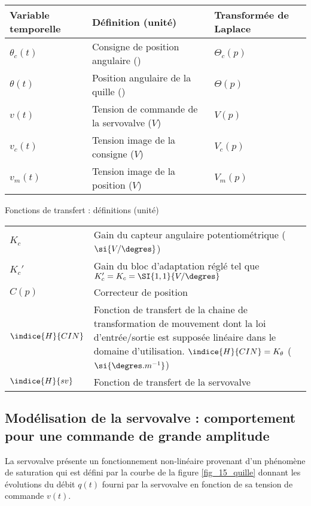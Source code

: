 \begin{center}
\begin{tabular}{lll}
\hline
Variable temporelle	& Définition (unité)				& Transformée de Laplace \\
\hline
$\theta_c(t)$		& Consigne de position angulaire (\degres)	& $\Theta_c(p)$ \\
$\theta(t)$		& Position angulaire de la quille (\degres)	& $\Theta(p)$ \\
$v(t)$			& Tension de commande de la servovalve ($V$)	& $V(p)$ 	\\
$v_c(t)$		& Tension image de la consigne ($V$)		& $V_c(p)$ 	\\
$v_m(t)$ 	 	& Tension image de la position ($V$)		& $V_m(p)$ 	\\
\hline
\end{tabular}
\end{center}



\begin{center}
Fonctions de transfert : définitions (unité)
\begin{tabular}{lp{14cm}}
\hline
$K_c$			& Gain du capteur angulaire potentiométrique ($\si{V/\degres}$) \\
$K_c'$			& Gain du bloc d’adaptation réglé tel que $K_c' = K_c = \SI{1,1}{V/\degres}$ \\
$C(p)$			& Correcteur de position 	\\
$\indice{H}{CIN}$ 	& Fonction de transfert de la chaine de transformation de mouvement 
			dont la loi d’entrée/sortie est supposée linéaire dans le domaine d’utilisation.                
			 $\indice{H}{CIN} = K_{\theta}$ ($\si{\degres.m^{-1}}$) \\
$\indice{H}{sv}$	& Fonction de transfert de la servovalve  \\
\hline
\end{tabular}
\end{center}
\fi




\subsection{Modélisation de la servovalve : comportement pour une commande de grande amplitude}

\ifprof
\else
La servovalve présente un fonctionnement non-linéaire provenant d’un phénomène de saturation qui est défini par la courbe de la figure \ref{fig_15_quille} donnant les évolutions du débit $q(t)$ fourni par la servovalve en fonction de sa tension de commande $v(t)$. 

